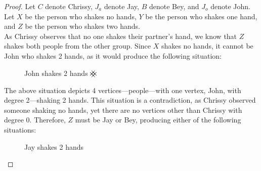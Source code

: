 \documentclass[article, 12pt]{article}
\theoremstyle{definition}
\newcommand{\contradiction}{{\hbox{%
    \setbox0=\hbox{$\mkern-3mu\times\mkern-3mu$}%
    \setbox1=\hbox to0pt{\hss$\times$\hss}%
    \copy0\raisebox{0.5\wd0}{\copy1}\raisebox{-0.5\wd0}{\box1}\box0
}}}
\begin{document}
    \begin{proof}
        Let $C$ denote Chrissy, $J_a$ denote Jay, $B$ denote Bey, and $J_o$ denote John. 
        \\[12pt]
        Let $X$ be the person who shakes no hands, $Y$ be the person who shakes one hand, and $Z$ be the person who shakes two hands.
        \\[12pt]
        As Chrissy observes that no one shakes their partner's hand, we know that $Z$ shakes both people from the other group. Since $X$ shakes no hands, it cannot be John who shakes 2 hands, as it would produce the following situation:
        \begin{figure}[H]
            \centering
            \caption{John shakes 2 hands $\contradiction$} 
        \end{figure}
        The above situation depicts 4 vertices---people---with one vertex, John, with degree 2---shaking 2 hands. This situation is a contradiction, as Chrissy observed someone shaking no hands, yet there are no vertices other than Chrissy with degree 0. Therefore, $Z$ must be Jay or Bey, producing either of the following situations:
        \begin{figure}[H]
            \centering
            \begin{minipage}[t]{.4\textwidth}
                \centering
                \caption{Jay shakes 2 hands}
            \end{minipage}
            \begin{minipage}[t]{.4\textwidth}
                \centering
\end{minipage}
\end{figure}
\end{proof}
\end{document}
